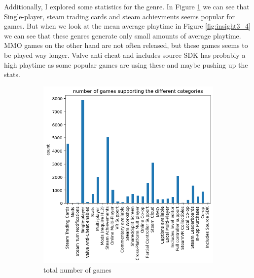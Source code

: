 \documentclass[11pt]{article}
\begin{document}
  Additionally, I explored some statistics for the genre. In Figure \ref{fig:insight3_3} we can see that Single-player, steam trading cards and steam achievments seems popular for games. But when we look at the mean average playtime in Figure \ref{fig:insight3_4} we can see that these genres generate only small amounts of average playtime. MMO games on the other hand are not often released, but these games seems to be played way longer. 
  Valve anti cheat and includes source SDK has probably a high playtime as some popular games are using these and maybe pushing up the stats. 

  \begin{figure}[h]
    \centering
    \begin{subfigure}[b]{0.49\textwidth}
        \centering
        \includegraphics[width=\textwidth]{graphics/insight3_graph3.png}
        \caption{total number of games}
        \label{fig:insight3_3}
    \end{subfigure}
    \hfill
    \begin{subfigure}[b]{0.49\textwidth}
        \centering

\end{subfigure}
\end{figure}
\end{document}
